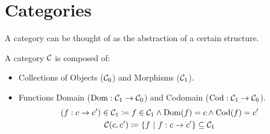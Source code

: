 \section{Categories}
A category can be thought of as the abstraction of a certain structure.

\begin{definition}
  A category $\mathcal{C}$ is composed of: \parencite{fong_spivak:7sketches}
  \begin{itemize}
    \item Collections of Objects ($\mathcal{C}_0$) and Morphisms ($\mathcal{C}_1$).
    \item Functions Domain ($\mathrm{Dom}:\mathcal{C}_1\to \mathcal{C}_0$) and Codomain
      ($\mathrm{Cod}: \mathcal{C}_1 \to \mathcal{C}_0$).
      \[
        \begin{gathered}
          (f : c\to c') \in \mathcal{C}_1
          \coloneqq f\in \mathcal{C}_1
          \land \mathrm{Dom}(f) = c \land \mathrm{Cod}(f) = c'\\
          \mathcal{C}(c, c') \coloneqq \{f\ |\ f : c \to c'\}\subseteq \mathcal{C}_1
        \end{gathered}
      \]
  \end{itemize}


\end{definition}
